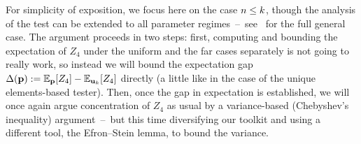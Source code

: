 For simplicity of exposition, we focus here on the case $n \leq k$, though the analysis of the test can be extended to all parameter regimes~--~see~\citet{DiakonikolasGPP18} for the full general case. The argument proceeds in two steps: first, computing and bounding the expectation of $Z_4$ under the uniform and the far cases separately is not going to really work, so instead we will bound the expectation gap $\Delta(\p)\eqdef \bE{\p}{Z_4}-\bE{\uniform_{\ab}}{Z_4}$ directly (a little like in the case of the unique elements-based tester). Then, once the gap in expectation is established, we will once again argue concentration of $Z_4$ as usual by a variance-based (Chebyshev's inequality) argument~--~but this time diversifying our toolkit and using a different tool, the Efron--Stein lemma, to bound the variance.

